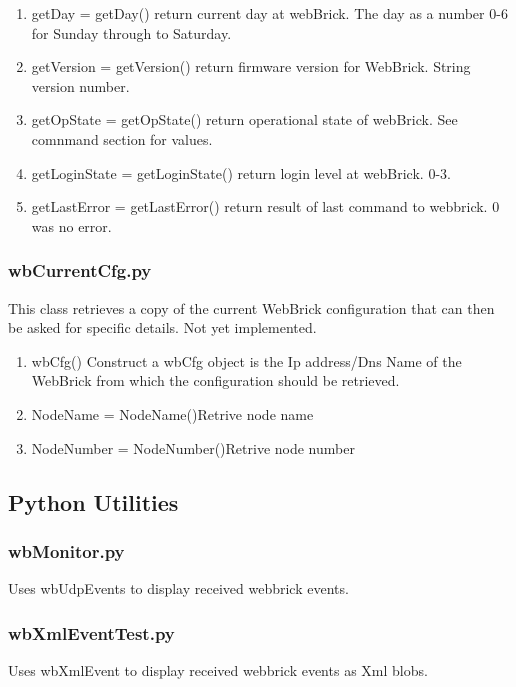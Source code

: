 \begin{enumerate}
\item getDay = getDay() return current day at webBrick.
          The day as a number 0-6 for Sunday through to Saturday.
\item getVersion = getVersion() return firmware version for WebBrick.
          String version number.
\item getOpState = getOpState() return operational state of webBrick.
          See comnmand section for values.
\item getLoginState = getLoginState() return login level at webBrick.
          0-3.
\item getLastError = getLastError() return result of last command to webbrick.
          0 was no error.
\end{enumerate}

\subsubsection{wbCurrentCfg.py}
This class retrieves a copy of the current WebBrick configuration that can then be asked for specific details.
Not yet implemented.

\begin{enumerate}
\item wbCfg() Construct a wbCfg object
         is the Ip address/Dns Name of the WebBrick from which the configuration should be retrieved.

\item NodeName = NodeName()Retrive node name
\item NodeNumber = NodeNumber()Retrive node number
    
\end{enumerate}

\subsection{Python Utilities}

\subsubsection{wbMonitor.py}
Uses wbUdpEvents to display received webbrick events.

\subsubsection{wbXmlEventTest.py}
Uses wbXmlEvent to display received webbrick events as Xml blobs.

